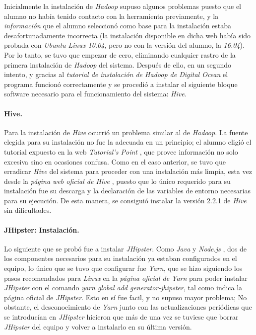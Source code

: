 \par
Inicialmente la instalación de \textit{Hadoop} supuso algunos problemas puesto que el alumno no había tenido contacto con la herramienta previamente, y la \textit{información} \cite{hadoop_installation_bad} que el alumno seleccionó como base para la instalación estaba desafortunadamente incorrecta (la instalación disponible en dicha web había sido probada con \textit{Ubuntu Linux 10.04}, pero no con la versión del alumno, la \textit{16.04}). Por lo tanto, se tuvo que empezar de cero, eliminando cualquier rastro de la primera instalación de \textit{Hadoop} del sistema. Después de ello, en un segundo intento, y gracias al \textit{tutorial de instalación de Hadoop de Digital Ocean} \cite{hadoop_installation} el programa funcionó correctamente y se procedió a instalar el siguiente bloque software necesario para el funcionamiento del sistema: \textit{Hive}.

\bigskip
\par
\paragraph*{Hive.}

\par
Para la instalación de \textit{Hive} ocurrió un problema similar al de \textit{Hadoop}. La fuente elegida para su instalación no fue la adecuada en un principio; el alumno eligió el tutorial expuesto en la web \textit{Tutorial's Point} \cite{hivetutorialspoint}, que provee información no solo excesiva sino en ocasiones confusa. Como en el caso anterior, se tuvo que erradicar \textit{Hive} del sistema para proceder con una instalación más limpia, esta vez desde la \textit{página web oficial de Hive} \cite{hive_installation}, puesto que lo único requerido para su instalación fue su descarga y la declaración de las variables de entorno necesarias para su ejecución. De esta manera, se consiguió instalar la versión 2.2.1 de \textit{Hive} sin dificultades. 

\bigskip
\par
\paragraph*{JHipster: Instalación.}

\par
Lo siguiente que se probó fue a instalar \textit{JHipster}. Como \textit{Java} y \textit{Node.js} \cite{nodejs}, dos de los componentes necesarios para su instalación ya estaban configurados en el equipo, lo único que se tuvo que configurar fue \textit{Yarn}, que se hizo siguiendo los pasos recomendados para \textit{Linux} en la \textit{página oficial de Yarn} \cite{yarninstall} para poder instalar \textit{JHipster} con el comando \textit{yarn global add generator-jhipster}, tal como indica la página oficial de \textit{JHipster}. Esto en sí fue facil, y no supuso mayor problema; No obstante, el desconocimiento de \textit{Yarn} junto con las actualizaciones periódicas que se introducían en \textit{JHipster} hicieron que más de una vez se tuviese que borrar \textit{JHipster} del equipo y volver a instalarlo en su última versión.  

